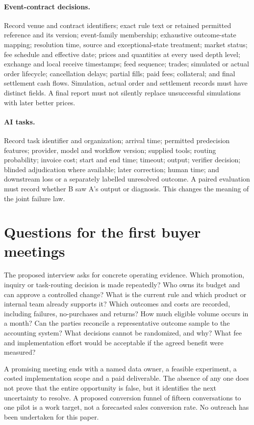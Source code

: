\documentclass[11pt]{article}
\theoremstyle{remark}\newtheorem{example}{Example}
\begin{document}
\paragraph{Event-contract decisions.}
Record venue and contract identifiers; exact rule text or retained permitted
reference and its version; event-family membership; exhaustive outcome-state
mapping; resolution time, source and exceptional-state treatment; market
status; fee schedule and effective date; prices and quantities at every used
depth level; exchange and local receive timestamps; feed sequence; trades;
simulated or actual order lifecycle; cancellation delays; partial fills; paid
fees; collateral; and final settlement cash flows. Simulation, actual order and
settlement records must have distinct fields. A final report must not silently
replace unsuccessful simulations with later better prices.

\paragraph{AI tasks.}
Record task identifier and organization; arrival time; permitted predecision
features; provider, model and workflow version; supplied tools; routing
probability; invoice cost; start and end time; timeout; output; verifier
decision; blinded adjudication where available; later correction; human time;
and downstream loss or a separately labelled unresolved outcome. A paired
evaluation must record whether B saw A's output or diagnosis. This changes the
meaning of the joint failure law.

\section{Questions for the first buyer meetings}
The proposed interview asks for concrete operating evidence. Which promotion,
inquiry or task-routing decision is made repeatedly? Who owns its budget and
can approve a controlled change? What is the current rule and which product
or internal team already supports it? Which outcomes and costs are recorded,
including failures, no-purchases and returns? How much eligible volume occurs
in a month? Can the parties reconcile a representative outcome sample to the
accounting system? What decisions cannot be randomized, and why? What fee and
implementation effort would be acceptable if the agreed benefit were measured?

A promising meeting ends with a named data owner, a feasible experiment,
a costed implementation scope and a paid deliverable. The absence of any one
does not prove that the entire opportunity is false, but it identifies the
next uncertainty to resolve. A proposed conversion funnel of fifteen
conversations to one pilot is a work target, not a forecasted sales conversion
rate. No outreach has been undertaken for this paper.
\end{document}
